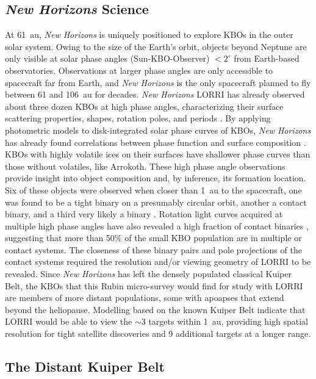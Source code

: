 \documentclass[modern,linenumbers,trackchanges,preprint]{aastex631}
\begin{document}
\subsection{{\it New Horizons} Science}
At 61~au, {\it New Horizons} is uniquely positioned to explore KBOs in the outer solar system.
Owing to the size of the Earth's orbit, objects beyond Neptune are only visible at solar phase angles (Sun-KBO-Observer) $<2^\circ$ from Earth-based observatories.
Observations at larger phase angles are only accessible to spacecraft far from Earth, and {\it New Horizons} is the only spacecraft planned to fly between 61 and 106~au for decades.
{\it New Horizons} LORRI has already observed about three dozen KBOs at high phase angles, characterizing their surface scattering properties, shapes, rotation poles, and periods \citep{Porter2016, Verbiscer2019, Verbiscer2022}.
By applying photometric models to disk-integrated solar phase curves of KBOs, {\it New Horizons} has already found correlations between phase function and surface composition \citep{Verbiscer2022}. 
KBOs with highly volatile ices on their surfaces have shallower phase curves than those without volatiles, like Arrokoth. 
These high phase angle observations provide insight into object composition and, by inference, its formation location.
Six of these objects were observed when closer than 1~au to the spacecraft, one was found to be a tight binary on a presumably circular orbit, another a contact binary, and a third very likely a binary \citep{2022PSJ.....3...46W}.
Rotation light curves acquired at multiple high phase angles have also revealed a high fraction of contact binaries \citep{Porter2024}, suggesting that more than 50\% of the small KBO population are in multiple or contact systems. The closeness of these binary pairs and pole projections of the contact systems required the resolution and/or viewing geometry of LORRI to be revealed.
Since {\it New Horizons} has left the densely populated classical Kuiper Belt, the KBOs that this Rubin micro-survey would find for study with LORRI are members of more distant populations, some with apoapses that extend beyond the heliopause.
Modelling based on the known Kuiper Belt indicate that LORRI would be able to view the $\sim$3 targets within 1~au, providing high spatial resolution for tight satellite discoveries and 9 additional targets at a longer range. 

\subsection{The Distant Kuiper Belt}
\end{document}
